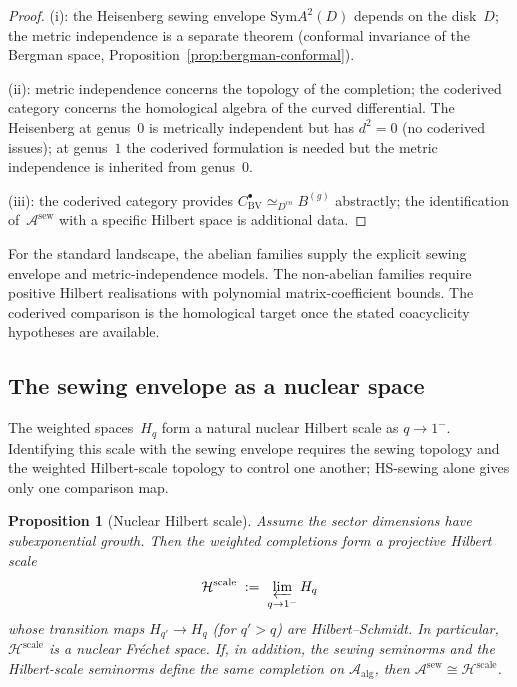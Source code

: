 \documentclass[11pt,reqno]{amsart}
\newtheorem{proposition}[theorem]{Proposition}
\theoremstyle{definition}
\theoremstyle{remark}
\newcommand{\cA}{\mathcal{A}}
\newcommand{\Sym}{\mathrm{Sym}}
\newcommand{\Dco}{D^{\mathrm{co}}}
\numberwithin{equation}{section}
\begin{document}
\begin{proof}
(i): the Heisenberg sewing envelope $\Sym A^2(D)$ depends on
the disk~$D$; the metric independence is a separate theorem
(conformal invariance of the Bergman space,
Proposition~\ref{prop:bergman-conformal}).

(ii): metric independence concerns the topology of the
completion; the coderived category concerns the homological
algebra of the curved differential.  The Heisenberg at
genus~$0$ is metrically independent but has $d^2 = 0$ (no
coderived issues); at genus~$1$ the coderived formulation
is needed but the metric independence is inherited from
genus~$0$.

(iii): the coderived category provides
$C^\bullet_{\mathrm{BV}} \simeq_{\Dco} B^{(g)}$ abstractly;
the identification of~$\cA^{\mathrm{sew}}$ with a specific
Hilbert space is additional data.
\end{proof}

For the standard landscape, the abelian families supply the explicit
sewing envelope and metric-independence models. The non-abelian
families require positive Hilbert realisations with polynomial
matrix-coefficient bounds. The coderived comparison is the
homological target once the stated coacyclicity hypotheses are
available.

\subsection{The sewing envelope as a nuclear
 space}\label{subsec:nuclear}

The weighted spaces~$H_q$ form a natural nuclear Hilbert scale as
$q \to 1^-$. Identifying this scale with the sewing envelope requires
the sewing topology and the weighted Hilbert-scale topology to control
one another; HS-sewing alone gives only one comparison map.

\begin{proposition}[Nuclear Hilbert scale]
\label{prop:nuclear-structure}
Assume the sector dimensions have subexponential growth. Then the
weighted completions form a projective Hilbert scale
\[
\mathcal H^{\mathrm{scale}}
\;:=\;
\varprojlim_{q \to 1^-} H_q
\]
whose transition maps $H_{q'} \to H_q$ (for $q' > q$) are
Hilbert--Schmidt. In particular, $\mathcal H^{\mathrm{scale}}$ is a
nuclear Fr\'echet space. If, in addition, the sewing seminorms and
the Hilbert-scale seminorms define the same completion on
$\cA_{\mathrm{alg}}$, then
$\cA^{\mathrm{sew}}\cong\mathcal H^{\mathrm{scale}}$.
\end{proposition}
\end{document}

